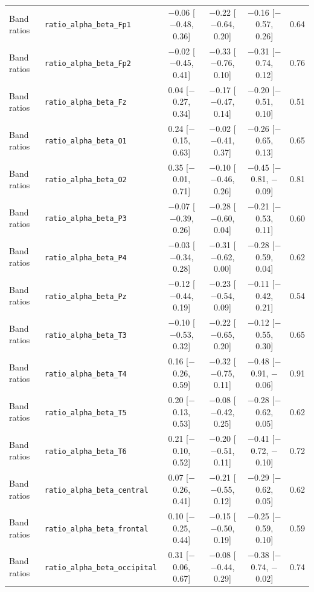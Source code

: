 {\begin{longtable}{llcccc}
Band ratios & \texttt{ratio\_alpha\_beta\_Fp1} & $-$0.06 [$-$0.48, 0.36] & $-$0.22 [$-$0.64, 0.20] & $-$0.16 [$-$0.57, 0.26] & 0.64 \\
Band ratios & \texttt{ratio\_alpha\_beta\_Fp2} & $-$0.02 [$-$0.45, 0.41] & $-$0.33 [$-$0.76, 0.10] & $-$0.31 [$-$0.74, 0.12] & 0.76 \\
Band ratios & \texttt{ratio\_alpha\_beta\_Fz} & 0.04 [$-$0.27, 0.34] & $-$0.17 [$-$0.47, 0.14] & $-$0.20 [$-$0.51, 0.10] & 0.51 \\
Band ratios & \texttt{ratio\_alpha\_beta\_O1} & 0.24 [$-$0.15, 0.63] & $-$0.02 [$-$0.41, 0.37] & $-$0.26 [$-$0.65, 0.13] & 0.65 \\
Band ratios & \texttt{ratio\_alpha\_beta\_O2} & 0.35 [$-$0.01, 0.71] & $-$0.10 [$-$0.46, 0.26] & $-$0.45 [$-$0.81, $-$0.09] & 0.81 \\
Band ratios & \texttt{ratio\_alpha\_beta\_P3} & $-$0.07 [$-$0.39, 0.26] & $-$0.28 [$-$0.60, 0.04] & $-$0.21 [$-$0.53, 0.11] & 0.60 \\
Band ratios & \texttt{ratio\_alpha\_beta\_P4} & $-$0.03 [$-$0.34, 0.28] & $-$0.31 [$-$0.62, 0.00] & $-$0.28 [$-$0.59, 0.04] & 0.62 \\
Band ratios & \texttt{ratio\_alpha\_beta\_Pz} & $-$0.12 [$-$0.44, 0.19] & $-$0.23 [$-$0.54, 0.09] & $-$0.11 [$-$0.42, 0.21] & 0.54 \\
Band ratios & \texttt{ratio\_alpha\_beta\_T3} & $-$0.10 [$-$0.53, 0.32] & $-$0.22 [$-$0.65, 0.20] & $-$0.12 [$-$0.55, 0.30] & 0.65 \\
Band ratios & \texttt{ratio\_alpha\_beta\_T4} & 0.16 [$-$0.26, 0.59] & $-$0.32 [$-$0.75, 0.11] & $-$0.48 [$-$0.91, $-$0.06] & 0.91 \\
Band ratios & \texttt{ratio\_alpha\_beta\_T5} & 0.20 [$-$0.13, 0.53] & $-$0.08 [$-$0.42, 0.25] & $-$0.28 [$-$0.62, 0.05] & 0.62 \\
Band ratios & \texttt{ratio\_alpha\_beta\_T6} & 0.21 [$-$0.10, 0.52] & $-$0.20 [$-$0.51, 0.11] & $-$0.41 [$-$0.72, $-$0.10] & 0.72 \\
Band ratios & \texttt{ratio\_alpha\_beta\_central} & 0.07 [$-$0.26, 0.41] & $-$0.21 [$-$0.55, 0.12] & $-$0.29 [$-$0.62, 0.05] & 0.62 \\
Band ratios & \texttt{ratio\_alpha\_beta\_frontal} & 0.10 [$-$0.25, 0.44] & $-$0.15 [$-$0.50, 0.19] & $-$0.25 [$-$0.59, 0.10] & 0.59 \\
Band ratios & \texttt{ratio\_alpha\_beta\_occipital} & 0.31 [$-$0.06, 0.67] & $-$0.08 [$-$0.44, 0.29] & $-$0.38 [$-$0.74, $-$0.02] & 0.74 \\

\end{longtable}}
